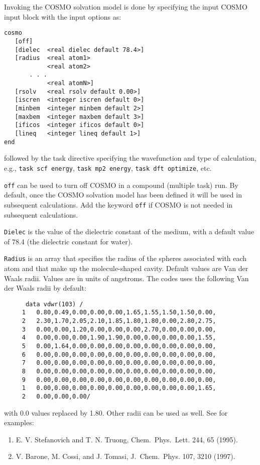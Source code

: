 Invoking the COSMO solvation model is done by specifying the input
COSMO input block with the input options as:
\begin{verbatim}
cosmo
   [off]
   [dielec  <real dielec default 78.4>]
   [radius  <real atom1>
            <real atom2>
       . . .
            <real atomN>]
   [rsolv   <real rsolv default 0.00>]
   [iscren  <integer iscren default 0>]
   [minbem  <integer minbem default 2>]
   [maxbem  <integer maxbem default 3>]
   [ificos  <integer ificos default 0>]
   [lineq   <integer lineq default 1>]
end
\end{verbatim}
followed by the task directive specifying the wavefunction and
type of calculation, e.g., \verb+task scf energy+, \verb+task mp2 energy+,
\verb+task dft optimize+, etc.

\verb+off+ can be used to turn off COSMO in a compound (multiple task)
run. By default, once the COSMO solvation model has been defined it will
be used in subsequent calculations. Add the keyword \verb+off+ if COSMO
is not needed in subsequent calculations.

\verb+Dielec+ is the value of the dielectric constant of the medium, 
with a default value of 78.4 (the dielectric constant for water).

\verb+Radius+ is an array that specifies the radius of the spheres
associated with each atom and that make up the molecule-shaped cavity.
Default values are Van der Waals radii. Values are in units of angstroms.
The codes uses the following Van der Waals radii by default:
\begin{verbatim}
      data vdwr(103) /
     1   0.80,0.49,0.00,0.00,0.00,1.65,1.55,1.50,1.50,0.00,
     2   2.30,1.70,2.05,2.10,1.85,1.80,1.80,0.00,2.80,2.75,
     3   0.00,0.00,1.20,0.00,0.00,0.00,2.70,0.00,0.00,0.00,
     4   0.00,0.00,0.00,1.90,1.90,0.00,0.00,0.00,0.00,1.55,
     5   0.00,1.64,0.00,0.00,0.00,0.00,0.00,0.00,0.00,0.00,
     6   0.00,0.00,0.00,0.00,0.00,0.00,0.00,0.00,0.00,0.00,
     7   0.00,0.00,0.00,0.00,0.00,0.00,0.00,0.00,0.00,0.00,
     8   0.00,0.00,0.00,0.00,0.00,0.00,0.00,0.00,0.00,0.00,
     9   0.00,0.00,0.00,0.00,0.00,0.00,0.00,0.00,0.00,0.00,
     1   0.00,0.00,0.00,0.00,0.00,0.00,0.00,0.00,0.00,1.65,
     2   0.00,0.00,0.00/
\end{verbatim}
with 0.0 values replaced by 1.80. Other radii can be used as well.
See for examples:

\begin{enumerate}
\item E. V. Stefanovich and T. N. Truong, Chem.~Phys.~Lett. 244, 65 (1995).
\item V. Barone, M. Cossi, and J. Tomasi, J.~Chem.~Phys. 107, 3210 (1997).
\end{enumerate}


